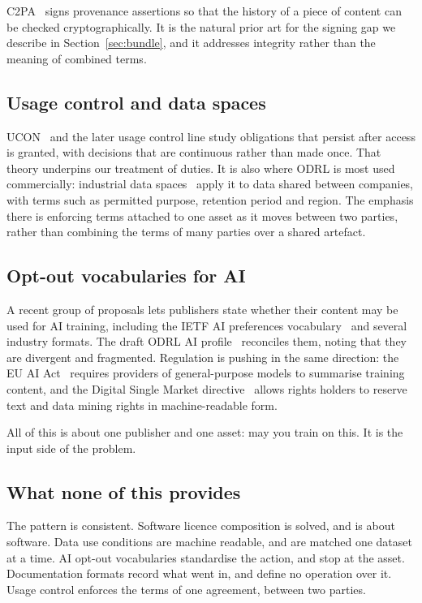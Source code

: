 \documentclass[sigconf,anonymous,review]{acmart}
\begin{document}
C2PA~\cite{c2pa} signs provenance assertions so that the history of a piece of
content can be checked cryptographically. It is the natural prior art for the
signing gap we describe in Section~\ref{sec:bundle}, and it addresses integrity
rather than the meaning of combined terms.

\subsection{Usage control and data spaces}

UCON~\cite{ucon} and the later usage control line study obligations that persist
after access is granted, with decisions that are continuous rather than made
once. That theory underpins our treatment of duties. It is also where ODRL is
most used commercially: industrial data spaces~\cite{ids} apply it to data shared
between companies, with terms such as permitted purpose, retention period and
region. The emphasis there is enforcing terms attached to one asset as it moves
between two parties, rather than combining the terms of many parties over a
shared artefact.

\subsection{Opt-out vocabularies for AI}

A recent group of proposals lets publishers state whether their content may be
used for AI training, including the IETF AI preferences
vocabulary~\cite{aipref} and several industry formats. The draft ODRL AI
profile~\cite{odrl-ai} reconciles them, noting that they are divergent and
fragmented. Regulation is pushing in the same direction: the EU AI
Act~\cite{aiact} requires providers of general-purpose models to summarise
training content, and the Digital Single Market directive~\cite{dsm} allows
rights holders to reserve text and data mining rights in machine-readable form.

All of this is about one publisher and one asset: may you train on this. It is
the input side of the problem.

\subsection{What none of this provides}

The pattern is consistent. Software licence composition is solved, and is about
software. Data use conditions are machine readable, and are matched one dataset
at a time. AI opt-out vocabularies standardise the action, and stop at the asset.
Documentation formats record what went in, and define no operation over it.
Usage control enforces the terms of one agreement, between two parties.
\end{document}
